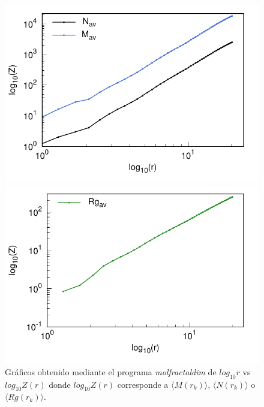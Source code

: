 	\begin{figure}[H]
		\hspace{-0.3cm} 
		\begin{minipage}{0.49\textwidth}
			\centering
			\includegraphics[width=\linewidth]{graphs/molmass/Zvsr.pdf}
		\end{minipage}
		\hspace{0.2cm}
		\begin{minipage}{0.49\textwidth}
			\centering
			\includegraphics[width=\linewidth]{graphs/molmass/Zvsr-Rg.pdf}
		\end{minipage}
		
		\caption{
			Gr\'{a}ficos obtenido mediante el programa \textit{molfractaldim} de $log_{10}r$ vs $log_{10}Z(r)$ donde $log_{10}Z(r)$ 
			corresponde a $\langle M(r_k) \rangle$, $\langle N(r_k) \rangle$ 
			o $\langle Rg(r_k) \rangle$. }
		\label{fig:GrafD}
	\end{figure}

